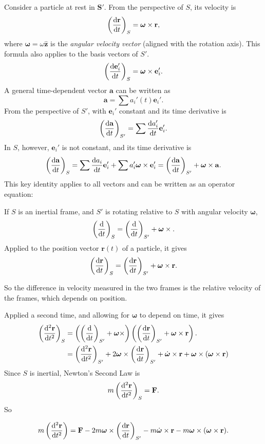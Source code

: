 \documentclass[a4paper]{article}
\begin{document}
Consider a particle at rest in $\mathbf{S}'$. From the perspective of $S$, its velocity is
\[
  \left(\frac{\mathrm{d} \mathbf{r}}{\mathrm{d} t}\right)_S = \boldsymbol\omega\times \mathbf{r},
\]
where $\boldsymbol\omega = \omega\hat{\mathbf{z}}$ is the \emph{angular velocity vector} (aligned with the rotation axis). This formula also applies to the basis vectors of $S'$.
\[
  \left(\frac{\mathrm{d} \mathbf{e}_i'}{\mathrm{d} t}\right)_S = \boldsymbol\omega\times \mathbf{e}_i'.
\]
A general time-dependent vector $\mathbf{a}$ can be written as
\[
  \mathbf{a} = \sum a_i'(t) \mathbf{e}_i'.
\]
From the perspective of $S'$, with $\mathbf{e}_i'$ constant and its time derivative is
\[
  \left(\frac{\mathrm{d} \mathbf{a}}{\mathrm{d} t}\right)_{S'} = \sum \frac{\mathrm{d} a_i'}{\mathrm{d} t}\mathbf{e}_i'.
\]
In $S$, however, $\mathbf{e}_i'$ is not constant, and its time derivative is
\[
  \left(\frac{\mathrm{d} \mathbf{a}}{\mathrm{d} t}\right)_S = \sum \frac{\mathrm{d} a_i}{\mathrm{d} t}\mathbf{e}_i' + \sum a_i'\boldsymbol\omega \times \mathbf{e}_i' = \left(\frac{\mathrm{d} \mathbf{a}}{\mathrm{d} t}\right)_{S'} + \boldsymbol\omega \times \mathbf{a}.
\]
This key identity applies to all vectors and can be written as an operator equation:
\begin{prop}
  If $S$ is an inertial frame, and $S'$ is rotating relative to $S$ with angular velocity $\boldsymbol \omega$, 
  \[
    \left(\frac{\mathrm{d}}{\mathrm{d} t}\right)_S = \left(\frac{\mathrm{d}}{\mathrm{d} t}\right)_{S'} + \boldsymbol\omega \times.
  \]
  Applied to the position vector $\mathbf{r}(t)$ of a particle, it gives
  \[
    \left(\frac{\mathrm{d} \mathbf{r}}{\mathrm{d} t}\right)_S = \left(\frac{\mathrm{d} \mathbf{r}}{\mathrm{d} t}\right)_{S'} + \boldsymbol\omega \times \mathbf{r}.
  \]
\end{prop}
So the difference in velocity measured in the two frames is the relative velocity of the frames, which depends on position.

Applied a second time, and allowing for $\boldsymbol\omega$ to depend on time, it gives
\begin{align*}
  \left(\frac{\mathrm{d} ^2\mathbf{r}}{\mathrm{d} t^2}\right)_S &= \left(\left(\frac{\mathrm{d} }{\mathrm{d} t}\right)_{S'} + \boldsymbol\omega\times \right)\left(\left(\frac{\mathrm{d} \mathbf{r}}{\mathrm{d} t}\right)_{S'} + \boldsymbol\omega \times \mathbf{r}\right).\\
  &= \left(\frac{\mathrm{d}^2 \mathbf{r}}{\mathrm{d} t^2}\right)_{S'} + 2\boldsymbol \omega \times \left(\frac{\mathrm{d} \mathbf{r}}{\mathrm{d} t}\right)_{S'} + \dot{\boldsymbol\omega} \times \mathbf{r} + \boldsymbol\omega\times(\boldsymbol\omega\times \mathbf{r})
\end{align*}
Since $S$ is inertial, Newton's Second Law is
\[
  m\left(\frac{\mathrm{d} ^2\mathbf{r}}{\mathrm{d} t^2}\right)_S = \mathbf{F}.
\]
So
\begin{prop}
  \[
    m\left(\frac{\mathrm{d}^2 \mathbf{r}}{\mathrm{d} t^2}\right) = \mathbf{F} - 2m\boldsymbol\omega \times \left(\frac{\mathrm{d} \mathbf{r}}{\mathrm{d} t}\right)_{S'} - m\dot{\boldsymbol\omega}\times \mathbf{r} - m\boldsymbol\omega \times (\boldsymbol\omega \times \mathbf{r}).
  \]
\end{prop}
\end{document}
